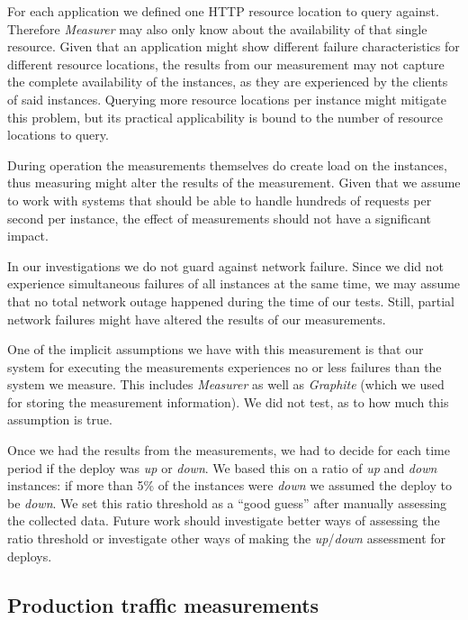 For each application we defined one HTTP resource location to query against. Therefore \emph{Measurer} may also only know about the availability of that single resource. Given that an application might show different failure characteristics for different resource locations, the results from our measurement may not capture the complete availability of the instances, as they are experienced by the clients of said instances. Querying more resource locations per instance might mitigate this problem, but its practical applicability is bound to the number of resource locations to query.

During operation the measurements themselves do create load on the instances, thus measuring might alter the results of the measurement. Given that we assume to work with systems that should be able to handle hundreds of requests per second per instance, the effect of measurements should not have a significant impact.

In our investigations we do not guard against network failure. Since we did not experience simultaneous failures of all instances at the same time, we may assume that no total network outage happened during the time of our tests. Still, partial network failures might have altered the results of our measurements.

One of the implicit assumptions we have with this measurement is that our system for executing the measurements experiences no or less failures than the system we measure. This includes \emph{Measurer} as well as \emph{Graphite} (which we used for storing the measurement information). We did not test, as to how much this assumption is true.

Once we had the results from the measurements, we had to decide for each time period if the deploy was \emph{up} or \emph{down}. We based this on a ratio of \emph{up} and \emph{down} instances: if more than 5\% of the instances were \emph{down} we assumed the deploy to be \emph{down}. We set this ratio threshold as a ``good guess'' after manually assessing the collected data. Future work should investigate better ways of assessing the ratio threshold or investigate other ways of making the \emph{up}/\emph{down} assessment for deploys.

\vfill\clearpage

\subsection{Production traffic measurements}
\label{subsec:existing_measurement}

